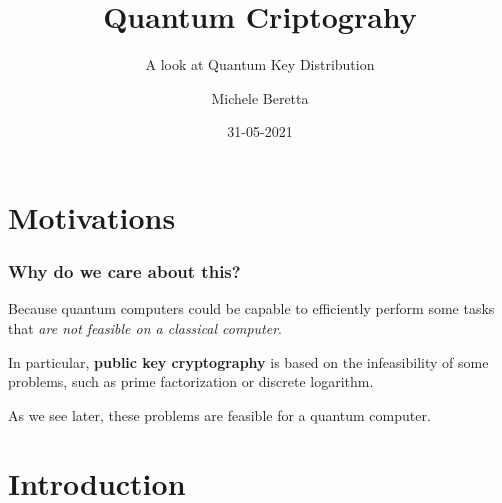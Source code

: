 \documentclass{beamer}
\title{Quantum Criptograhy}
\subtitle{A look at Quantum Key Distribution}
\author{Michele Beretta}
\institute{UniBG
  \\ \url{https://github.com/micheleberetta98/qkd-presentation}
}
\date{31-05-2021}
\begin{document}
  \begin{frame}[plain]
    \titlepage
  \end{frame}


  \section{Motivations}
  \begin{frame}
    \frametitle{Why do we care about this?}
    Because quantum computers could be capable to efficiently perform some
    tasks that \textit{are not feasible on a classical computer}.

    In particular, \textbf{public key cryptography} is based on the infeasibility of
    some problems, such as prime factorization or discrete logarithm.

    As we see later, these problems are feasible for a quantum computer.
  \end{frame}

  \section{Introduction}
\end{document}
